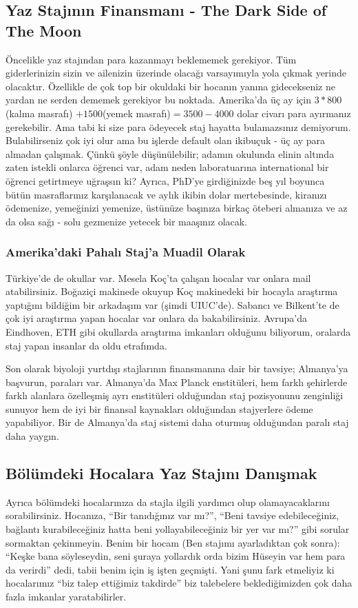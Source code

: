 \documentclass[12pt]{article}
\theoremstyle{break}
\begin{document}
\subsection{Yaz Stajının Finansmanı - The Dark Side of The Moon}
Öncelikle yaz stajından para kazanmayı beklememek gerekiyor. Tüm giderlerinizin sizin ve ailenizin üzerinde olacağı varsayımıyla yola çıkmak yerinde olacaktır. Özellikle de çok top bir okuldaki bir hocanın yanına gidecekseniz ne yardan ne serden dememek gerekiyor bu noktada. Amerika’da üç ay için $3 * 800$ (kalma masrafı) $+ 1500 $(yemek masrafı)$=3500-4000$ dolar civarı para ayırmanız gerekebilir. Ama tabi ki size para ödeyecek staj hayatta bulamazsınız demiyorum. Bulabilirseniz çok iyi olur ama bu işlerde default olan ikibuçuk - üç ay para almadan çalışmak. Çünkü şöyle düşünülebilir; adamın okulunda elinin altında zaten istekli onlarca öğrenci var, adam neden laboratuarına international bir öğrenci getirtmeye uğraşsın ki? Ayrıca, PhD’ye girdiğinizde beş yıl boyunca bütün masraflarınız karşılanacak ve aylık ikibin dolar mertebesinde, kiranızı ödemenize, yemeğinizi yemenize, üstünüze başınıza birkaç öteberi almanıza ve az da olsa sağı - solu gezmenize yetecek bir maaşınız olacak.

\subsubsection{Amerika’daki Pahalı Staj’a Muadil Olarak}
Türkiye’de de okullar var. Mesela Koç’ta çalışan hocalar var onlara mail atabilirsiniz. Boğaziçi makinede okuyup Koç makinedeki bir hocayla araştırma yaptığını bildiğim bir arkadaşım var (şimdi UIUC’de). Sabancı ve Bilkent’te de çok iyi araştırma yapan hocalar var onlara da bakabilirsiniz. Avrupa’da Eindhoven, ETH gibi okullarda araştırma imkanları olduğunu biliyorum, oralarda staj yapan insanlar da oldu etrafımda.

Son olarak biyoloji yurtdışı stajlarının finansmanına dair bir tavsiye; Almanya’ya başvurun, paraları var. Almanya’da Max Planck enstitüleri, hem farklı şehirlerde farklı alanlara özelleşmiş ayrı enstitüleri olduğundan staj pozisyonunu zenginliği sunuyor hem de iyi bir finansal kaynakları olduğundan stajyerlere ödeme yapabiliyor. Bir de Almanya’da staj sistemi daha oturmuş olduğundan paralı staj daha yaygın. 

\subsection{Bölümdeki Hocalara Yaz Stajını Danışmak}
Ayrıca bölümdeki hocalarınıza da stajla ilgili yardımcı olup olamayacaklarını sorabilirsiniz. Hocanıza, “Bir tanıdığınız var mı?”, “Beni tavsiye edebileceğiniz, bağlantı kurabileceğiniz hatta beni yollayabileceğiniz bir yer var mı?” gibi sorular sormaktan çekinmeyin. Benim bir hocam (Ben stajımı ayarladıktan çok sonra): ``Keşke bana söyleseydin, seni şuraya yollardık orda bizim Hüseyin var hem para da verirdi'' dedi, tabii benim için iş işten geçmişti. Yani şunu fark etmeliyiz ki hocalarımız “biz talep ettiğimiz takdirde” biz talebelere beklediğimizden çok daha fazla imkanlar yaratabilirler.
\end{document}
